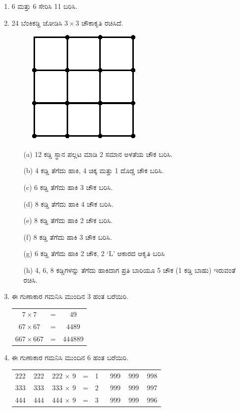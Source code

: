 \begin{enumerate}
\item 6 ಮತ್ತು 6 ಸೇರಿಸಿ 11 ಬರಿಸಿ. 

\item 24 ಬೆಂಕಿಕಡ್ಡಿ ಜೋಡಿಸಿ $3\times 3$ ಚೌಕಾಕೃತಿ ರಚಿಸಿದೆ. 
\begin{figure}[H]
\centering
\includegraphics{images/chap8/q13.eps}
\end{figure}

\begin{itemize}
\item[(a)] 12 ಕಡ್ಡಿ ಸ್ಥಾನ ಪಲ್ಲಟ ಮಾಡಿ 2 ಸಮಾನ ಅಳತೆಯ ಚೌಕ ಬರಿಸಿ.
\item[(b)] 4 ಕಡ್ಡಿ ತೆಗೆದು ಹಾಕಿ, 4 ಚಿಕ್ಕ ಮತ್ತು 1 ದೊಡ್ಡ ಚೌಕ ಬರಿಸಿ.
\item[(c)] 6 ಕಡ್ಡಿ ತೆಗೆದು ಹಾಕಿ 3 ಚೌಕ ಬರಿಸಿ.
\item[(d)] 8 ಕಡ್ಡಿ ತೆಗೆದು ಹಾಕಿ 4 ಚೌಕ ಬರಿಸಿ.
\item[(e)] 8 ಕಡ್ಡಿ ತೆಗೆದು ಹಾಕಿ 2 ಚೌಕ ಬರಿಸಿ.
\item[(f)] 8 ಕಡ್ಡಿ ತೆಗೆದು ಹಾಕಿ 3 ಚೌಕ ಬರಿಸಿ.
\item[(g)] 6 ಕಡ್ಡಿ ತೆಗೆದು ಹಾಕಿ 2 ಚೌಕ, 2 `L' ಆಕಾರದ ಆಕೃತಿ ಬರಿಸಿ 
\item[(h)] 4, 6, 8 ಕಡ್ಡಿಗಳನ್ನು ತೆಗೆದು ಹಾಕಿದಾಗ ಪ್ರತಿ ಬಾರಿಯೂ 5 ಚೌಕ (1 ಕಡ್ಡಿ ಬಾಹು) ಇರುವಂತೆ ರಚಿಸಿ. 
\end{itemize}

\item ಈ ಗುಣಾಕಾರ ಗಮನಿಸಿ ಮುಂದಿನ 3 ಹಂತ ಬರೆಯಿರಿ.

\begin{tabular}[t]{c@{\;}c@{\;}c}
$7\times 7$ & = & $49$\\
$67\times 67$ & = & $4489$\\
$667\times 667$ & = & $444889$
\end{tabular}


\item ಈ ಗುಣಾಕಾರ ಗಮನಿಸಿ ಮುಂದಿನ 6 ಹಂತ ಬರೆಯಿರಿ. 

\begin{tabular}[t]{c@{\;}c@{\;}c}
222 ~ 222 ~ 222 $\times$ 9 & = & 1 ~~ 999 ~ 999 ~ 998\\
333 ~ 333 ~ 333 $\times$ 9 & = & 2 ~~ 999 ~ 999 ~ 997\\
444 ~ 444 ~ 444 $\times$ 9 & = & 3 ~~ 999 ~ 999 ~ 996
\end{tabular}


\end{enumerate}
